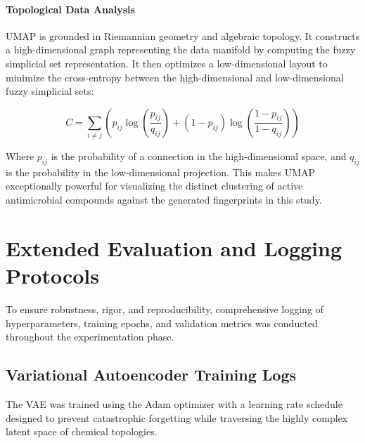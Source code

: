\subsubsection{Topological Data Analysis}
UMAP is grounded in Riemannian geometry and algebraic topology. It constructs a high-dimensional graph representing the data manifold by computing the fuzzy simplicial set representation. It then optimizes a low-dimensional layout to minimize the cross-entropy between the high-dimensional and low-dimensional fuzzy simplicial sets:

\begin{equation}
C = \sum_{i \neq j} \left( p_{ij} \log \left( \frac{p_{ij}}{q_{ij}} \right) + (1 - p_{ij}) \log \left( \frac{1 - p_{ij}}{1 - q_{ij}} \right) \right)
\end{equation}

Where $p_{ij}$ is the probability of a connection in the high-dimensional space, and $q_{ij}$ is the probability in the low-dimensional projection. This makes UMAP exceptionally powerful for visualizing the distinct clustering of active antimicrobial compounds against the generated fingerprints in this study.

\chapter{Extended Evaluation and Logging Protocols}

To ensure robustness, rigor, and reproducibility, comprehensive logging of hyperparameters, training epochs, and validation metrics was conducted throughout the experimentation phase.

\section{Variational Autoencoder Training Logs}

The VAE was trained using the Adam optimizer with a learning rate schedule designed to prevent catastrophic forgetting while traversing the highly complex latent space of chemical topologies.

